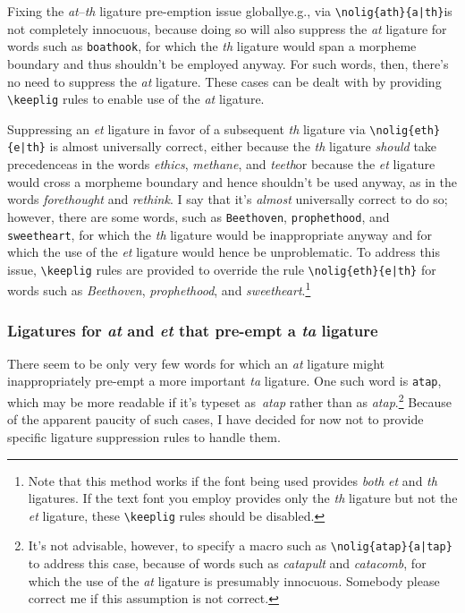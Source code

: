 \documentclass[11pt]{article}
\newcommand{\opt}[1]{\texttt{#1}}
\newcommand{\cmmd}[1]{\texttt{\textbackslash #1}}
\begin{document}
Fixing the \emph{at}--\emph{th} ligature pre-emption issue globally\textemdash e.g., via \Verb+\nolig{ath}{a|th}+\textemdash is not completely innocuous, because doing so will also suppress the \emph{at} ligature for words such as \opt{boathook}, for which the \emph{th} ligature would span a morpheme boundary and thus shouldn't be employed anyway. For such words, then, there's no need to suppress the \emph{at} ligature. These cases can be dealt with by providing \cmmd{keeplig} rules to enable use of the \emph{at} ligature.

Suppressing an \emph{et} ligature in favor of a subsequent \emph{th} ligature via \Verb+\nolig{eth}{e|th}+ is almost universally correct, either because the \emph{th} ligature \emph{should} take precedence\textemdash as in the words \emph{ethics}, \emph{methane}, and \emph{teeth}\textemdash or because the \emph{et} ligature would cross a morpheme boundary and hence shouldn't be used anyway, as in the words \emph{forethought} and \emph{rethink}. 
I say that it's \emph{almost} universally correct to do so; however, there are some words, such as \opt{Beethoven}, \opt{prophethood}, and \opt{sweetheart}, for which the \emph{th} ligature would be inappropriate anyway and for which the use of the \emph{et} ligature would hence be unproblematic. To address this issue, \cmmd{keeplig} rules are provided to override the rule \Verb+\nolig{eth}{e|th}+ for words such as \emph{Beethoven}, \emph{prophethood}, and \emph{sweetheart}.\footnote{Note that this method works if the font being used provides \emph{both} \emph{et} and \emph{th} ligatures. If the text font you employ provides only the \emph{th} ligature but not the \emph{et} ligature, these \cmmd{keeplig} rules should be disabled.}



\subsubsection*{Ligatures for \emph{at} and \emph{et} that pre-empt a \emph{ta} ligature}

There seem to be only very few words for which an \emph{at} ligature might inappropriately pre-empt a more important \emph{ta} ligature. One such word is \opt{atap}, which may be more readable if it's typeset as~\emph{a\mbox{ta}p} rather than as \emph{atap}.\footnote{It's not advisable, however, to specify a macro such as \Verb+\nolig{atap}{a|tap}+ to address this case, because of words such as \emph{catapult} and \emph{catacomb}, for which the use of the \emph{at} ligature is presumably innocuous. Somebody please correct me if this assumption is not correct.} Because of the apparent paucity of such cases, I have decided for now not to provide specific ligature suppression rules to handle them.
\end{document}
